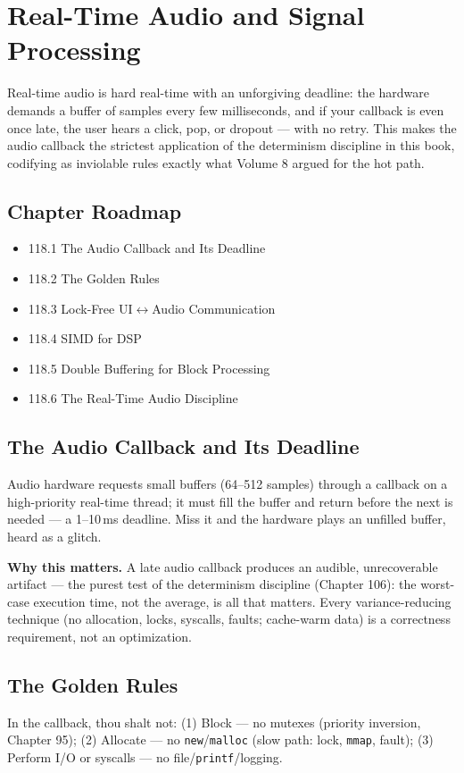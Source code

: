 \chapter{Real-Time Audio and Signal Processing}

Real-time audio is hard real-time with an unforgiving deadline: the hardware demands a buffer of samples every few milliseconds, and if your callback is even once late, the user hears a click, pop, or dropout --- with no retry. This makes the audio callback the strictest application of the determinism discipline in this book, codifying as inviolable rules exactly what Volume 8 argued for the hot path.

\section*{Chapter Roadmap}
\begin{itemize}
\item 118.1 The Audio Callback and Its Deadline
\item 118.2 The Golden Rules
\item 118.3 Lock-Free UI$\leftrightarrow$Audio Communication
\item 118.4 SIMD for DSP
\item 118.5 Double Buffering for Block Processing
\item 118.6 The Real-Time Audio Discipline
\end{itemize}

\section{The Audio Callback and Its Deadline}
Audio hardware requests small buffers (64--512 samples) through a callback on a high-priority real-time thread; it must fill the buffer and return before the next is needed --- a 1--10\,ms deadline. Miss it and the hardware plays an unfilled buffer, heard as a glitch.

\textbf{Why this matters.} A late audio callback produces an audible, unrecoverable artifact --- the purest test of the determinism discipline (Chapter 106): the worst-case execution time, not the average, is all that matters. Every variance-reducing technique (no allocation, locks, syscalls, faults; cache-warm data) is a correctness requirement, not an optimization.

\section{The Golden Rules}
In the callback, thou shalt not: (1) Block --- no mutexes (priority inversion, Chapter 95); (2) Allocate --- no \texttt{new}/\texttt{malloc} (slow path: lock, \texttt{mmap}, fault); (3) Perform I/O or syscalls --- no file/\texttt{printf}/logging.

